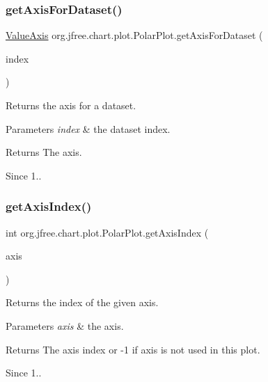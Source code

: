 \subsubsection{\texorpdfstring{get\+Axis\+For\+Dataset()}{getAxisForDataset()}}
{\footnotesize\ttfamily \mbox{\hyperlink{classorg_1_1jfree_1_1chart_1_1axis_1_1_value_axis}{Value\+Axis}} org.\+jfree.\+chart.\+plot.\+Polar\+Plot.\+get\+Axis\+For\+Dataset (\begin{DoxyParamCaption}\item[{int}]{index }\end{DoxyParamCaption})}

Returns the axis for a dataset.


\begin{DoxyParams}{Parameters}
{\em index} & the dataset index.\\
\hline
\end{DoxyParams}
\begin{DoxyReturn}{Returns}
The axis.
\end{DoxyReturn}
\begin{DoxySince}{Since}
1.. 
\end{DoxySince}
\mbox{\label{classorg_1_1jfree_1_1chart_1_1plot_1_1_polar_plot_a8aa582abdd297b61c3e3f0df52fd2591}} 
\subsubsection{\texorpdfstring{get\+Axis\+Index()}{getAxisIndex()}}
{\footnotesize\ttfamily int org.\+jfree.\+chart.\+plot.\+Polar\+Plot.\+get\+Axis\+Index (\begin{DoxyParamCaption}\item[{\mbox{\hyperlink{classorg_1_1jfree_1_1chart_1_1axis_1_1_value_axis}{Value\+Axis}}}]{axis }\end{DoxyParamCaption})}

Returns the index of the given axis.


\begin{DoxyParams}{Parameters}
{\em axis} & the axis.\\
\hline
\end{DoxyParams}
\begin{DoxyReturn}{Returns}
The axis index or -\/1 if axis is not used in this plot.
\end{DoxyReturn}
\begin{DoxySince}{Since}
1.. 
\end{DoxySince}
\mbox{\label{classorg_1_1jfree_1_1chart_1_1plot_1_1_polar_plot_aa5bf9d06a22374312897b364d41dd339}} 
